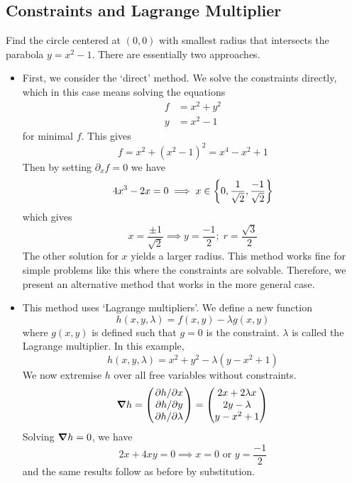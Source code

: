 \subsection{Constraints and Lagrange Multiplier}
\begin{example}
	Find the circle centered at \((0, 0)\) with smallest radius that intersects the parabola \(y = x^2 - 1\).
	There are essentially two approaches.
	\begin{itemize}
		\item First, we consider the `direct' method.
		      We solve the constraints directly, which in this case means solving the equations
		      \begin{align*}
			      f & = x^2 + y^2 \\
			      y & = x^2 - 1
		      \end{align*}
		      for minimal \(f\).
		      This gives
		      \[
			      f = x^2 + (x^2 - 1)^2 = x^4 - x^2 + 1
		      \]
		      Then by setting \(\partial_x f = 0\) we have
		      \[
			      4x^3 - 2x = 0 \implies x \in \qty{0, \frac{1}{\sqrt 2}, \frac{-1}{\sqrt 2}}
		      \]
		      which gives
		      \[
			      x = \frac{\pm 1}{\sqrt{2}} \implies y = \frac{-1}{2};\; r = \frac{\sqrt{3}}{2}
		      \]
		      The other solution for \(x\) yields a larger radius.
		      This method works fine for simple problems like this where the constraints are solvable.
		      Therefore, we present an alternative method that works in the more general case.
		\item This method uses `Lagrange multipliers'.
		      We define a new function
		      \[
			      h(x, y, \lambda) = f(x, y) - \lambda g(x, y)
		      \]
		      where \(g(x, y)\) is defined such that \(g = 0\) is the constraint.
		      \(\lambda\) is called the Lagrange multiplier.
		      In this example,
		      \[
			      h(x, y, \lambda) = x^2 + y^2 - \lambda (y - x^2 + 1)
		      \]
		      We now extremise \(h\) over all free variables without constraints.
		      \[
			      \grad{h} = \begin{pmatrix}
				      \pdv*{h}{x} \\ \pdv*{h}{y} \\ \pdv*{h}{\lambda}
			      \end{pmatrix} = \begin{pmatrix}
				      2x + 2\lambda x \\
				      2y - \lambda    \\
				      y - x^2 + 1
			      \end{pmatrix}
		      \]
		      Solving \(\grad{h} = 0\), we have
		      \[
			      2x + 4xy = 0 \implies x = 0 \text{ or } y = \frac{-1}{2}
		      \]
		      and the same results follow as before by substitution.
	\end{itemize}
\end{example}

